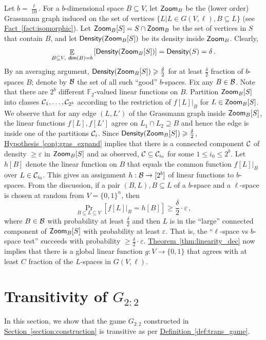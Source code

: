 \documentclass[11pt]{article}
\numberwithin{equation}{section}
\theoremstyle{definition}
\theoremstyle{plain}
\newcommand{\expref}[2]{\hyperref[#2]{#1~\ref{#2}}}
\newcommand\Prob[2]{{\Pr_{#1}\left[ {#2} \right]}}
\newcommand\Expect[2]{{\mathop{\mathbb{E}}_{#1}\left[ {#2} \right]}}
\newcommand\eps{\varepsilon}
\newcommand*\dimm{{\sf dim}}
\renewcommand\geq{\geqslant}
\renewcommand\leq{\leqslant}
\begin{document}
Let $b=\frac{\ell}{10}$. For a $b$-dimensional space $B\subseteq V$, let ${\sf Zoom}_B$ be the (lower order) Grassmann graph
induced on the set of vertices $\{L | L \in G(V,\ell), B \subseteq L\}$ (see \expref{Fact}{fact:isomorphic}).
Let ${\sf Zoom}_B[S] = S \cap {\sf Zoom}_B$
be the set of vertices in $S$ that contain $B$,
and let ${\sf Density} ( {\sf Zoom}_B[S] )$ be its density inside ${\sf Zoom}_B$. Clearly,
 $$ \Expect{B\subseteq V,\ \dimm(B)=b}{ {\sf Density} ( {\sf Zoom}_B[S] )  } =
   {\sf Density} (S) =  \delta\,.$$%
By an averaging argument, ${\sf Density} ( {\sf Zoom}_B[S] ) \geq \frac{\delta}{2}$ for at least $\frac{\delta}{2}$ fraction of $b$-spaces $B$; denote by
${\cal B}$ the set of all such ``good'' $b$-spaces.
Fix any $B \in {\cal B}$. Note that there are $2^b$ different $\mathbb{F}_2$-valued linear functions on $B$. Partition ${\sf Zoom}_B[S]$ into classes ${\cal C}_1,\ldots,
{\cal C}_{2^b}$ according to the restriction of $f[L]|_B$ for $L \in {\sf Zoom}_B[S]$. We observe that for any edge $(L, L')$ of the Grassmann graph inside
${\sf Zoom}_B[S]$, the linear functions $f[L], f[L']$ agree on $L_1 \cap L_2 \supseteq B$ and hence the edge is inside one of the partitions
${\cal C}_i$. Since ${\sf Density} ( {\sf Zoom}_B[S] ) \geq \frac{\delta}{2}$, \expref{Hypothesis}{conj:gras_expand} implies that there is a connected component ${\cal C}$ of density $\geq \eps$ in  ${\sf Zoom}_B[S]$ and as observed, ${\cal C} \subseteq {\cal C}_{i_0}$ for some $1 \leq i_0 \leq 2^b$. Let $h[B]$ denote the linear function on $B$ that equals the common
function $f[L]|_B$ over $L \in {\cal C}_{i_0}$. This gives an assignment $h: {\cal B} \to [2^b]$ of linear functions to $b$-spaces. From
the discussion, if a pair $(B, L), B \subseteq L$ of a $b$-space and a $\ell$-space is chosen at random from $V = \{0,1\}^n$, then
 $$ \Prob{B \subseteq L \subseteq V}{ f[L]|_B = h[B] } \geq \frac{\delta}{2} \cdot \eps\,,$$%
where $B \in {\cal B}$ with probability at least $\frac{\delta}{2}$ and then $L$ is in the ``large'' connected component of ${\sf Zoom}_B[S]$
 with probability at least $\eps$.
That is, the ``$\ell$-space vs $b$-space test'' succeeds with probability $\geq \frac{\delta}{2} \cdot \eps$. \expref{Theorem}{thm:linearity_dec} now implies that there
is a global linear function $g: V \to \{0,1\}$ that agrees with at least $C$ fraction of the $L$-spaces in $G(V,\ell)$.


\section{Transitivity of \texorpdfstring{$G_{2:2}$}{G\_{2:2}}}
\label{appendix:transitive}
In this section,  we show that the game  $G_{2:2}$ constructed in \expref{Section}{section:construction} is transitive as per
\expref{Definition}{def:trans_game}.
\end{document}
